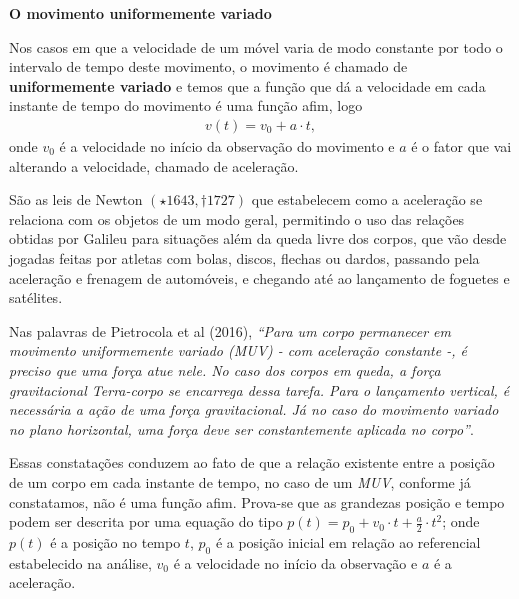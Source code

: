 \textbf{O movimento uniformemente variado}

Nos casos em que a velocidade de um móvel varia de modo constante por todo o intervalo de tempo deste movimento, o movimento é chamado de \textbf{uniformemente variado} e temos que a função que dá a velocidade em cada instante de tempo do movimento é uma função afim, logo
\begin{equation*}
\begin{split}v(t)=v_0 + a \cdot t,\end{split}
\end{equation*}
onde \(v_0\) é a velocidade no início da observação do movimento e \(a\) é o fator que vai alterando a velocidade, chamado de aceleração.

São as leis de Newton \((\star 1643, \dagger 1727)\) que estabelecem como a aceleração se relaciona com os objetos de um modo geral, permitindo o uso das relações obtidas por Galileu para situações além da queda livre dos corpos, que vão desde jogadas feitas por atletas com bolas, discos, flechas ou dardos, passando pela aceleração e frenagem de automóveis, e chegando até ao lançamento de foguetes e satélites.

Nas palavras de Pietrocola et al (2016), \emph{“Para um corpo permanecer em movimento uniformemente variado (MUV) - com aceleração constante -, é preciso que uma força atue nele. No caso dos corpos em queda, a força gravitacional Terra-corpo se encarrega dessa tarefa. Para o lançamento vertical, é necessária a ação de uma força gravitacional. Já no caso do movimento variado no plano horizontal, uma força deve ser constantemente aplicada no corpo”}.

Essas constatações conduzem ao fato de que a relação existente entre a posição de um corpo em cada instante de tempo, no caso de um \emph{MUV}, conforme já constatamos, não é uma função afim. Prova-se que as grandezas posição e tempo podem ser descrita por uma equação do tipo \(p(t)=p_0+v_0 \cdot t + \frac{a}{2} \cdot t^2\); onde \(p(t)\) é a posição no tempo \(t\), \(p_0\) é a posição inicial em relação ao referencial estabelecido na análise, \(v_0\) é a velocidade no início da observação e \(a\) é a aceleração.


